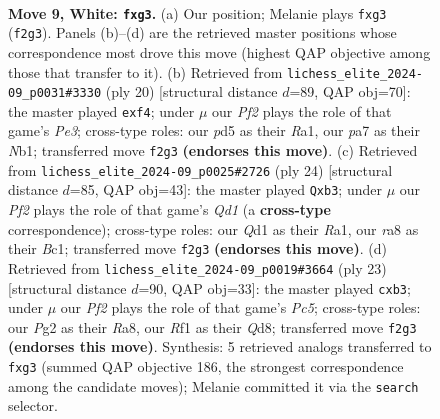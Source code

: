 \documentclass[11pt]{article}
\begin{document}
\clearpage

\begin{figure}[p]\centering
\begin{subfigure}{0.46\textwidth}\centering
\resizebox{\linewidth}{!}{%
\newchessgame
\chessboard[
  setfen={rnbq1rk1/p4ppp/1p2pn2/2pp4/3P4/2PBPNb1/PP3PPP/RN1Q1RK1 w - - 0 9},
  showmover=false,
  pgfstyle=straightmove, color=movearrow, markmove={f2-g3}
]}
\caption{}
\end{subfigure}\hfill
\begin{subfigure}{0.46\textwidth}\centering
\resizebox{\linewidth}{!}{%
\newchessgame
\chessboard[
  setfen={r1b2rk1/ppq2ppp/2N1pn2/2pp4/3P1b2/1PPBP3/P4PPP/RN1Q1RK1 w - - 0 11},
  showmover=false,
  pgfstyle=straightmove, color=movearrow, markmove={e3-f4}
]}
\caption{}
\end{subfigure}
\\[4pt]
\begin{subfigure}{0.46\textwidth}\centering
\resizebox{\linewidth}{!}{%
\newchessgame
\chessboard[
  setfen={r2q1rk1/ppp2pp1/1b1p1nnp/4p3/3PP3/1bP2N1P/PP3PP1/R1BQRNK1 w - - 0 13},
  showmover=false,
  pgfstyle=straightmove, color=movearrow, markmove={d1-b3}
]}
\caption{}
\end{subfigure}\hfill
\begin{subfigure}{0.46\textwidth}\centering
\resizebox{\linewidth}{!}{%
\newchessgame
\chessboard[
  setfen={r2qk2r/1b1nbppp/p3pn2/1p6/P1pP4/1P2PN2/2B1QPPP/RNBR2K1 b kq - 0 12},
  showmover=false,
  pgfstyle=straightmove, color=movearrow, markmove={c4-b3}
]}
\caption{}
\end{subfigure}
\caption{\textbf{Move 9, White: \texttt{fxg3}.} (a) Our position; Melanie plays \texttt{fxg3} (\texttt{f2g3}). Panels (b)--(d) are the retrieved master positions whose correspondence most drove this move (highest QAP objective among those that transfer to it). (b) Retrieved from \texttt{lichess\_elite\_2024-09\_p0031\#3330} (ply 20) [structural distance $d$=89, QAP obj=70]: the master played \texttt{exf4}; under $\mu$ our \emph{Pf2} plays the role of that game's \emph{Pe3}; cross-type roles: our \emph{p}d5 as their \emph{R}a1, our \emph{p}a7 as their \emph{N}b1; transferred move \texttt{f2g3} \textbf{(endorses this move)}. (c) Retrieved from \texttt{lichess\_elite\_2024-09\_p0025\#2726} (ply 24) [structural distance $d$=85, QAP obj=43]: the master played \texttt{Qxb3}; under $\mu$ our \emph{Pf2} plays the role of that game's \emph{Qd1} (a \textbf{cross-type} correspondence); cross-type roles: our \emph{Q}d1 as their \emph{R}a1, our \emph{r}a8 as their \emph{B}c1; transferred move \texttt{f2g3} \textbf{(endorses this move)}. (d) Retrieved from \texttt{lichess\_elite\_2024-09\_p0019\#3664} (ply 23) [structural distance $d$=90, QAP obj=33]: the master played \texttt{cxb3}; under $\mu$ our \emph{Pf2} plays the role of that game's \emph{Pc5}; cross-type roles: our \emph{P}g2 as their \emph{R}a8, our \emph{R}f1 as their \emph{Q}d8; transferred move \texttt{f2g3} \textbf{(endorses this move)}. Synthesis: 5 retrieved analogs transferred to \texttt{fxg3} (summed QAP objective 186, the strongest correspondence among the candidate moves); Melanie committed it via the \texttt{search} selector.}
\label{fig:thought-m16}
\end{figure}
\end{document}
